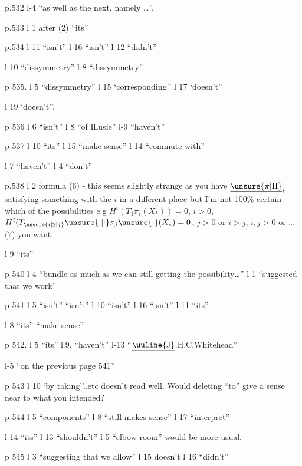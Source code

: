 
p.532 l-4 ``as well as the next, namely \ldots{}''.

p.533 l 1 after (2) ``its''

p.534 l 11 ``isn't'' \quad l 16 ``isn't'' \quad l-12 ``didn't''

l-10 ``dissymmetry'' \quad l-8 ``dissymmetry''

p 535. l 5 ``dissymmetry'' \quad l 15 `corresponding'' \quad l 17 `doesn't''

l 19 `doesn't''.

p 536 l 6 ``isn't'' \quad l 8 ``of Illusie'' \quad l-9 ``haven't''

p 537 l 10 ``its'' \quad l 15 ``make sense'' \quad l-14 ``commute with''

l-7 ``haven't'' \quad l-4 ``don't''

p.538 l 2 formula (6) - this seems slightly strange as you have $\underline{\unsure{\pi|\Pi}}_{i}$ satisfying something with the $i$ in a different place but I'm not 100\% certain  which of the possibilities e.g $H^{i}(T_{1}\pi_{i}(X_{\ast}))=0$, $i>0$, $H^{i}(T_{\unsure{i|2|j}}{\unsure{.|\cdot}}\pi_{j}\unsure{\cdot}(X_{\ast})=0$, $j>0$ or $i>j$,  \unsure{,}$i,j>0$ or \ldots{} (?) you want.

l 9 ``its''

p 540  l-4 ``bundle as much as we can   still getting the possibility\ldots'' \quad l-1 ``suggested that we work''

p 541 l 5 ``isn't'' ``isn't'' \quad l 10 ``isn't'' \quad l-16 ``isn't'' \quad l-11 ``its''

l-8 ``its'' ``make sense''

p 542. l 5 ``its'' \quad l.9. ``haven't'' \quad l-13 ``$\underline{\text{\uuline{J}}}$.H.C.Whitehead''

l-5 ``on the previous page 541''

p 543 l 10 `by taking''..etc doesn't read well. Would deleting ``to'' give  a sense near to what you intended?

p 544 l 5 ``components'' \quad l 8 ``still makes sense'' \quad l-17 ``interpret''

l-14 ``its'' \quad l-13 ``shouldn't'' \quad l-5 ``elbow room'' would be more usual.

p 545 l 3 ``suggesting that we allow'' \quad l 15 doesn't \quad l 16 ``didn't''

